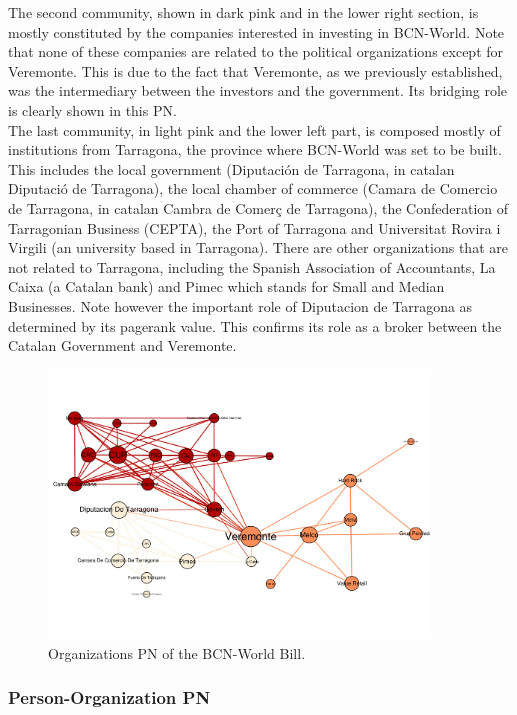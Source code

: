 The second community, shown in dark pink and in the lower right section, is mostly constituted by the companies interested in investing in BCN-World. Note that none of these companies are related to the political organizations except for Veremonte. This is due to the fact that Veremonte, as we previously established, was the intermediary between the investors and the government. Its bridging role is clearly shown in this PN. \\

The last community, in light pink and the lower left part, is composed mostly of institutions from Tarragona, the province where BCN-World was set to be built. This includes the local government (Diputaci\'on de Tarragona, in catalan Diputaci\'o de Tarragona), the local chamber of commerce (Camara de Comercio de Tarragona, in catalan Cambra de Comer\c{c} de Tarragona), the Confederation of Tarragonian Business (CEPTA), the Port of Tarragona and Universitat Rovira i Virgili (an university based in Tarragona). There are other organizations that are not related to Tarragona, including the Spanish Association of Accountants, La Caixa (a Catalan bank) and Pimec which stands for Small and Median Businesses. Note however the important role of Diputacion de Tarragona as determined by its pagerank value. This confirms its role as a broker between the Catalan Government and Veremonte.

\begin{figure}[H]
    \centering
    \includegraphics[width=0.9\textwidth]{figs/00062014-organizations}
    \caption{Organizations PN of the BCN-World Bill.}
    \label{fig:00062014-organizations}
\end{figure}


\subsubsection{Person-Organization PN}\label{subsec:bcn_world-person-organization}

